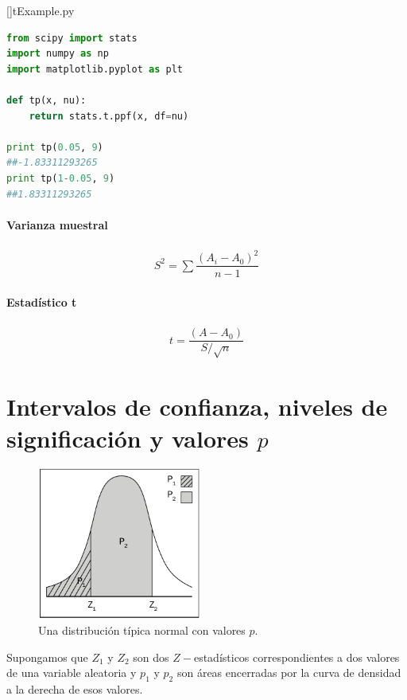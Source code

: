 []{tExample.py}
\begin{lstlisting}[language=Python]
from scipy import stats
import numpy as np
import matplotlib.pyplot as plt

def tp(x, nu):
    return stats.t.ppf(x, df=nu)

print tp(0.05, 9)
##-1.83311293265
print tp(1-0.05, 9)
##1.83311293265
\end{lstlisting}

\paragraph{Varianza muestral}
 \begin{align}
  S^{2}=\sum\dfrac{\left( A_{i}-A_{0} \right)^{2}}{n-1}
 \end{align}


\paragraph{Estadístico t}
\begin{align}
 t = \dfrac{\left( A-A_{0} \right)}{S/\sqrt{n}}
\end{align}



\section{Intervalos de confianza, niveles de significación y valores $p$}

\begin{figure}
 \centering
 \includegraphics[height=5cm,keepaspectratio=true]{./images/kum0401.png}
 \caption{Una distribución típica normal con valores $p.$}
 \label{fig:0401}
\end{figure}



Supongamos que $Z_{1}$ y $Z_{2}$ son dos $Z-$estadísticos correspondientes a dos valores de una variable aleatoria y $p_{1}$ y $p_{2}$ son áreas encerradas por la curva de densidad a la derecha de esos valores.


